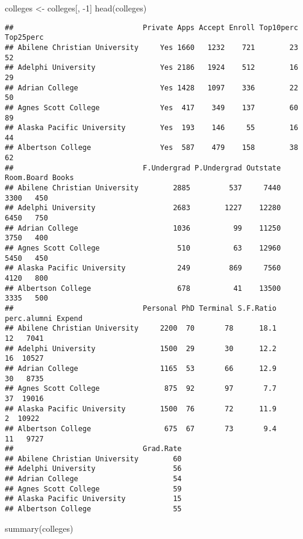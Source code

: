 \documentclass[
]{article}
\newenvironment{Shaded}{\begin{snugshade}}{\end{snugshade}}
\newcommand{\DecValTok}[1]{\textcolor[rgb]{0.00,0.00,0.81}{#1}}
\newcommand{\FunctionTok}[1]{\textcolor[rgb]{0.00,0.00,0.00}{#1}}
\newcommand{\NormalTok}[1]{#1}
\newcommand{\OtherTok}[1]{\textcolor[rgb]{0.56,0.35,0.01}{#1}}
\newcommand{\SpecialCharTok}[1]{\textcolor[rgb]{0.00,0.00,0.00}{#1}}
\begin{document}
\begin{Shaded}
\begin{Highlighting}[]
\NormalTok{colleges }\OtherTok{\textless{}{-}}\NormalTok{ colleges[, }\SpecialCharTok{{-}}\DecValTok{1}\NormalTok{]}
\FunctionTok{head}\NormalTok{(colleges)}
\end{Highlighting}
\end{Shaded}

\begin{verbatim}
##                              Private Apps Accept Enroll Top10perc Top25perc
## Abilene Christian University     Yes 1660   1232    721        23        52
## Adelphi University               Yes 2186   1924    512        16        29
## Adrian College                   Yes 1428   1097    336        22        50
## Agnes Scott College              Yes  417    349    137        60        89
## Alaska Pacific University        Yes  193    146     55        16        44
## Albertson College                Yes  587    479    158        38        62
##                              F.Undergrad P.Undergrad Outstate Room.Board Books
## Abilene Christian University        2885         537     7440       3300   450
## Adelphi University                  2683        1227    12280       6450   750
## Adrian College                      1036          99    11250       3750   400
## Agnes Scott College                  510          63    12960       5450   450
## Alaska Pacific University            249         869     7560       4120   800
## Albertson College                    678          41    13500       3335   500
##                              Personal PhD Terminal S.F.Ratio perc.alumni Expend
## Abilene Christian University     2200  70       78      18.1          12   7041
## Adelphi University               1500  29       30      12.2          16  10527
## Adrian College                   1165  53       66      12.9          30   8735
## Agnes Scott College               875  92       97       7.7          37  19016
## Alaska Pacific University        1500  76       72      11.9           2  10922
## Albertson College                 675  67       73       9.4          11   9727
##                              Grad.Rate
## Abilene Christian University        60
## Adelphi University                  56
## Adrian College                      54
## Agnes Scott College                 59
## Alaska Pacific University           15
## Albertson College                   55
\end{verbatim}

\begin{Shaded}
\begin{Highlighting}[]
\FunctionTok{summary}\NormalTok{(colleges)}
\end{Highlighting}
\end{Shaded}
\end{document}
